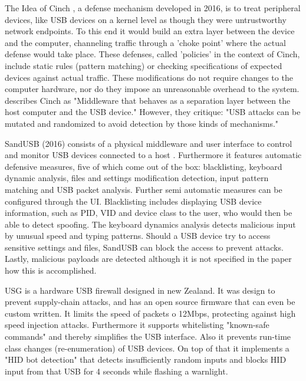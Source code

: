 The Idea of Cinch \cite{angelDefendingMaliciousPeripherals2016}, a defense mechanism developed in 2016, is to treat peripheral devices, like USB devices on a kernel level as though they were untrustworthy network endpoints. To this end it would build an extra layer between the device and the computer, channeling traffic through a 'choke point' where the actual defense would take place. These defenses, called 'policies' in the context of Cinch, include static rules (pattern matching) or checking specifications of expected devices against actual traffic. 
These modifications do not require changes to the computer hardware, nor do they impose an unreasonable overhead to the system.
\cite{farhiMalboardNovelUser2019} describes Cinch as "Middleware that behaves as a separation layer between the host computer and the USB device." However, they critique: "USB attacks can be mutated and randomized to avoid detection by those kinds of mechanisms."

SandUSB (2016) consists of a physical middleware and user interface to control and monitor USB devices connected to a host \cite{loeSandUSBInstallationfreeSandbox2016}. Furthermore it features automatic defensive measures, five of which come out of the box: blacklisting, keyboard dynamic analysis, files and settings modification detection, input pattern matching and USB packet analysis. Further semi automatic measures can be configured through the UI. 
Blacklisting includes displaying USB device information, such as PID, VID and device class to the user, who would then be able to detect spoofing. The keyboard dynamics analysis detects malicious input by unusual speed and typing patterns. Should a USB device try to access sensitive settings and files, SandUSB can block the access to prevent attacks. Lastly, malicious payloads are detected although it is not specified in the paper how this is accomplished. 

USG \cite{robertfiskRobertfiskUSG2016} is a hardware USB firewall designed in new Zealand. It was design to prevent supply-chain attacks, and has an open source firmware that can even be custom written. It limits the speed of packets o 12Mbps, protecting against high speed injection attacks. Furthermore it supports whitelisting "known-safe commands" and thereby simplifies the USB interface. Also it prevents run-time class changes (re-enumeration) of USB devices. On top of that it implements a "HID bot detection" that detects insufficiently random inputs and blocks HID input from that USB for 4 seconds while flashing a warnlight. 

